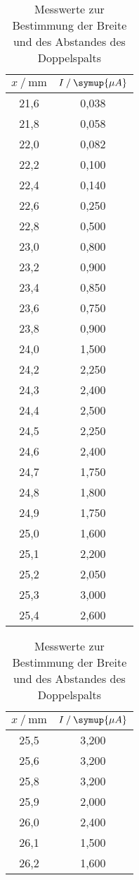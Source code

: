 \begin{table}[H]
   \centering
   \caption{Messwerte zur Bestimmung der Breite und des Abstandes des Doppelspalts}
   \label{tab:2dop}
   \begin{tabular}[t]{ c c }
 \toprule
 {$x\:/\: \mathrm{mm}$} & {$I\:/\: \symup{\mu A}$} \\
    \midrule
    21,6 & 0,038 \\
    21,8 & 0,058 \\
    22,0 & 0,082 \\
    22,2 & 0,100 \\
    22,4 & 0,140 \\
    22,6 & 0,250 \\
    22,8 & 0,500 \\
    23,0 & 0,800 \\
    23,2 & 0,900 \\
    23,4 & 0,850 \\
    23,6 & 0,750 \\
    23,8 & 0,900 \\
    24,0 & 1,500 \\
    24,2 & 2,250 \\
    24,3 & 2,400 \\
    24,4 & 2,500 \\
    24,5 & 2,250 \\
    24,6 & 2,400 \\
    24,7 & 1,750 \\
    24,8 & 1,800 \\
    24,9 & 1,750 \\
    25,0 & 1,600 \\
    25,1 & 2,200 \\
    25,2 & 2,050 \\
    25,3 & 3,000 \\
    25,4 & 2,600 \\
    \bottomrule
  \end{tabular}
  \qquad
  \begin{tabular}[t]{ c c }
\toprule
{$x\:/\: \mathrm{mm}$} & {$I\:/\: \symup{\mu A}$} \\
   \midrule
    25,5 & 3,200 \\
    25,6 & 3,200 \\
    25,8 & 3,200 \\
    25,9 & 2,000 \\
    26,0 & 2,400 \\
    26,1 & 1,500 \\
    26,2 & 1,600 \\

\end{tabular}
\end{table}
